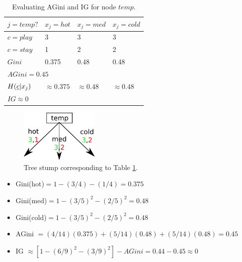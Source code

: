 \begin{table}[h!]
\centering
\begin{tabular}{|l|l|l|l|}
\hline
$j=temp?$ & \cellcolor[HTML]{CBCEFB}$x_j=hot$ & \cellcolor[HTML]{CBCEFB}$x_j=med$ & \cellcolor[HTML]{CBCEFB}$x_j=cold$ \\ \hline
\rowcolor[HTML]{FFFFC7} 
\cellcolor[HTML]{9AFF99}$c=play$ & 3 & 3 & 3 \\ \hline
\rowcolor[HTML]{FFFFC7} 
\cellcolor[HTML]{FFCCC9}$c=stay$ & 1 & 2 & 2 \\ \hline
$Gini$ & 0.375 & 0.48 & 0.48 \\ \hline
\multicolumn{4}{|l|}{$AGini=0.45$} \\ \hline
$H({\underline{c}}|x_j)$ & $\approx 0.375$ & $\approx 0.48$ & $\approx 0.48$ \\ \hline
\multicolumn{4}{|l|}{$IG\approx 0$} \\ \hline
\end{tabular}
\caption{Evaluating AGini and IG for node $temp$.}
\label{tab-temp-gini}
\end{table}



\begin{figure}[h!]
\centering
\includegraphics[width=1.5in]
{dtree/stump-3children.png}
\caption{Tree stump
corresponding to Table \ref{tab-temp-gini}.}
\label{fig-stump-3cildren}
\end{figure}



\begin{itemize}
\item Gini(hot)$=1-(3/4)-(1/4)=0.375$
\item Gini(med)$=1-(3/5)^2-(2/5)^2=0.48$
\item Gini(cold)$=1-(3/5)^2-(2/5)^2=0.48$
\item AGini $ = (4/14)(0.375)+
(5/14)(0.48) + (5/14)(0.48) = 0.45 $
\item IG $\approx [1 -(6/9)^2-(3/9)^2]-AGini= 
0.44-0.45\approx 0$
\end{itemize}

